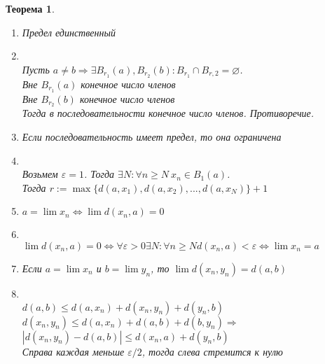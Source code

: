 \documentclass[12pt,letterpaper]{report}
\makeatletter
\newtheorem*{theorem-non}{Теорема}
\theoremstyle{definition}
\renewenvironment{proof}[1][\proofname]{%
   \par\pushQED{\qed}\normalfont%
   \topsep6\p@\@plus6\p@\relax
   \trivlist\item[\hskip\labelsep\bfseries#1\@addpunct{.}]%
   \ignorespaces
}{%
   \popQED\endtrivlist\@endpefalse
}
\makeatother
\begin{document}
    \begin{theorem-non}
        \quad \\
        \begin{enumerate}
            \item Предел единственный
            \begin{proof}
                \quad \\
                Пусть $a\neq b \Longrightarrow \exists B_{r_1}(a), B_{r_2}(b) : B_{r_1} \cap B_{r, 2} = \varnothing$. \\
                Вне $B_{r_1}(a)$ конечное число членов \\
                Вне $B_{r_2}(b)$ конечное число членов \\
                Тогда в последовательности конечное число членов. Противоречие.
            \end{proof}
            \item Если последовательность имеет предел, то она ограничена
            \begin{proof}
                \quad \\
                Возьмем $\varepsilon=1$. Тогда $\exists N: \forall n\geq N\ x_n \in B_1(a)$. \\
                Тогда $r:= \max\{d(a, x_1), d(a, x_2),..., d(a, x_N)\}+1$
            \end{proof}
            \item $a=\lim x_n \Longleftrightarrow \lim d(x_n, a)=0$
            \begin{proof}
                \quad \\
                $\lim d(x_n, a)=0 \Longleftrightarrow \forall \varepsilon > 0 \exists N : \forall n \geq N d(x_n, a) < \varepsilon \Longleftrightarrow \lim x_n = a$
            \end{proof}
            \item Если $a=\lim x_n$ и $b = \lim y_n$, то $\lim d(x_n, y_n) = d(a, b)$
            \begin{proof}
                \quad \\
                $d(a, b) \leq d(a, x_n)+d(x_n, y_n)+d(y_n, b)$
                $d(x_n, y_n) \leq d(a, x_n)+d(a, b)+d(b, y_n) \Longrightarrow$
                $|d(x_n, y_n)-d(a, b)|\leq d(x_n, a)+d(y_n, b)$ \\
                Справа каждая меньше $\varepsilon /2$, тогда слева стремится к нулю
            \end{proof}
        \end{enumerate}
    \end{theorem-non}
\end{document}
